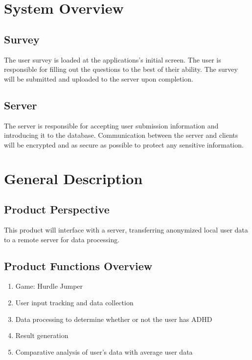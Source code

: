 \documentclass[a4wide]{article}
\begin{document}

\section{System Overview}

\subsection{Survey}

The user survey is loaded at the applications's initial screen.
The user is responsible for filling out the questions to the best of their ability.
The survey will be submitted and uploaded to the server upon completion. 

\subsection{Server}

The server is responsible for accepting user submission information and introducing it to the database.
Communication between the server and clients will be encrypted and as secure as possible to protect any sensitive information.


\section{General Description}

\subsection{Product Perspective}

This product will interface with a server, transferring anonymized local user
data to a remote server for data processing.


\subsection{Product Functions Overview}

\begin{enumerate}
\item Game: Hurdle Jumper
\item User input tracking and data collection
\item Data processing to determine whether or not the user has ADHD
\item Result generation
\item Comparative analysis of user's data with average user data
\end{enumerate}
\end{document}
